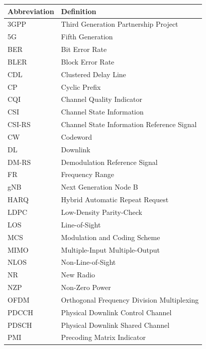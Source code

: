 \documentclass[a4paper,12pt,onecolumn]{article}
\begin{document}
\begin{longtable}{p{3cm}p{10cm}}
	\textbf{Abbreviation} & \textbf{Definition} \\
	\hline
	
	3GPP    & Third Generation Partnership Project \\
	
	5G      & Fifth Generation \\
	
	BER     & Bit Error Rate \\
	BLER    & Block Error Rate \\
	
	CDL     & Clustered Delay Line \\
	CP      & Cyclic Prefix \\
	CQI     & Channel Quality Indicator \\
	CSI     & Channel State Information \\
	CSI-RS  & Channel State Information Reference Signal \\
	CW      & Codeword \\
	
	DL      & Downlink \\
	DM-RS   & Demodulation Reference Signal \\
	
	FR & Frequency Range \\
	
	gNB     & Next Generation Node B \\
	
	HARQ    & Hybrid Automatic Repeat Request \\
	
	LDPC    & Low-Density Parity-Check \\
	LOS     & Line-of-Sight \\
	
	MCS     & Modulation and Coding Scheme \\
	MIMO    & Multiple-Input Multiple-Output \\
	
	NLOS    & Non-Line-of-Sight \\
	NR      & New Radio \\
	NZP     & Non-Zero Power \\
	
	OFDM    & Orthogonal Frequency Division Multiplexing \\
	
	PDCCH   & Physical Downlink Control Channel \\
	PDSCH   & Physical Downlink Shared Channel \\
	PMI     & Precoding Matrix Indicator \\


\end{longtable}
\end{document}
